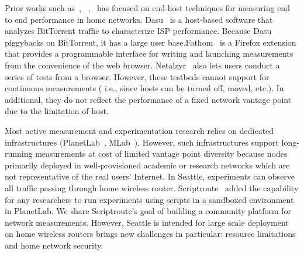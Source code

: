 Prior works such as~\cite{sanchez2014measurement},~\cite{dhawan2012fathom}
,~\cite{kreibich2010netalyzr} has focused on end-host techniques for 
measuring end to end performance in home networks. Dasu~\cite{
sanchez2014measurement} is a host-based software that analyzes BitTorrent 
traffic to characterize ISP performance. Because Dasu piggybacks on 
BitTorrent, it has a large user base.Fathom~\cite{dhawan2012fathom} is a 
Firefox extension that provides a programmable interface for writing and 
launching measurements from the convenience of the web browser. Netalzyr~\cite{kreibich2010netalyzr} also lets users conduct a series of tests from a 
browser. However, these testbeds cannot support for continuous measurements (
i.e., since hosts can be turned off, moved, etc.). In additional, they do 
not reflect the performance of a fixed network vantage point due to the 
limitation of host.

Most active measurement and experimentation research relies on dedicated infrastructures (PlanetLab~\cite{chun2003planetlab}, MLab~\cite{mlab}). However, such infrastructures support long-running measurements at cost of limited vantage point diversity because nodes primarily deployed in well-provisioned academic or research networks which are not representative of the real users' Internet. In Seattle, experiments can observe all traffic passing through home wireless router. Scriptroute~\cite{spring2003scriptroute} added the capability for any researchers to run experiments using scripts in a sandboxed environment in PlanetLab. We share Scriptroute's goal of building a community platform for network measurements. However, Seattle is intended for large scale deployment on home wireless routers brings new challenges in particular: resource limitations and home network security.

